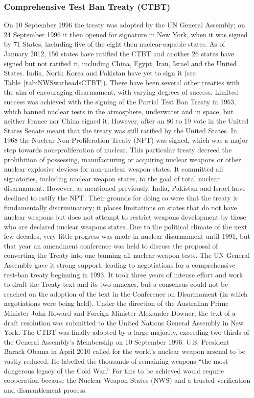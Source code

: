 \documentclass[twoside,titlepage,11pt,twocolumn,a4paper]{article}
\begin{document}
\subsubsection{Comprehensive Test Ban Treaty (CTBT)}
On 10 September 1996 the treaty was adopted by the UN General
Assembly; on 24 September 1996 it then opened for signature in New
York, when it was signed by 71 States, including five of the eight
then nuclear-capable states. As of January 2012, 156 states have
ratified the CTBT and another 26 states have signed but not ratified
it, including China, Egypt, Iran, Israel and the United States. India,
North Korea and Pakistan have yet to sign it (see
Table~\ref{tab:NWSwarheadsCTBT}).  There have been several other
treaties with the aim of encouraging disarmament, with varying degrees
of success. Limited success was achieved with the signing of the
Partial Test Ban Treaty in 1963, which banned nuclear tests in the
atmosphere, underwater and in space, but neither France nor China
signed it. However, after an 80 to 19 vote in the United States Senate
meant that the treaty was still ratified by the United States. In 1968
the Nuclear Non-Proliferation Treaty (NPT) was signed, which was a
major step towards non-proliferation of nuclear. This particular
treaty decreed the prohibition of possessing, manufacturing or
acquiring nuclear weapons or other nuclear explosive devices for
non-nuclear weapon states. It committed all signatories, including
nuclear weapon states, to the goal of total nuclear
disarmament. However, as mentioned previously, India, Pakistan and
Israel have declined to ratify the NPT. Their grounds for doing so
were that the treaty is fundamentally discriminatory; it places
limitations on states that do not have nuclear weapons but does not
attempt to restrict weapons development by those who are declared
nuclear weapons states.  Due to the political climate of the next few
decades, very little progress was made in nuclear disarmament until
1991, but that year an amendment conference was held to discuss the
proposal of converting the Treaty into one banning all nuclear-weapon
tests. The UN General Assembly gave it strong support, leading to
negotiations for a comprehensive test-ban treaty beginning in 1993. It
took three years of intense effort and work to draft the Treaty text
and its two annexes, but a consensus could not be reached on the
adoption of the text in the Conference on Disarmament (in which
negotiations were being held). Under the direction of the Australian
Prime Minister John Howard and Foreign Minister Alexander Downer, the
text of a draft resolution was submitted to the United Nations General
Assembly in New York. The CTBT was finally adopted by a large
majority, exceeding two-thirds of the General Assembly's Membership on
10 September 1996.  U.S. President Barack Obama in April 2010 called
for the world's nuclear weapon arsenal to be vastly reduced. He
labelled the thousands of remaining weapons ``the most dangerous legacy
of the Cold War.'' For this to be achieved would require cooperation
because the Nuclear Weapon States (NWS) and a trusted verification and
dismantlement process.
\end{document}
